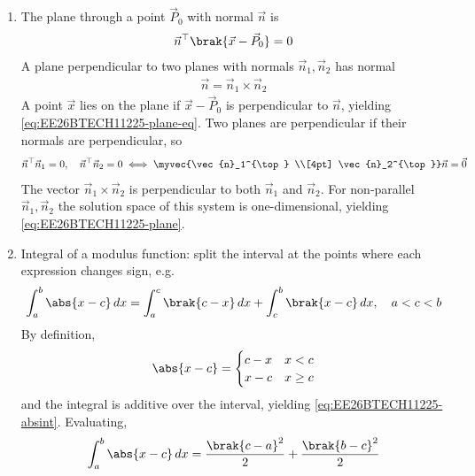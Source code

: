 \begin{enumerate}[label=\thesubsection.\arabic*, ref=\thesubsection.\theenumi]
\item The plane through a point $\vec{P}_0$ with normal $\vec{n}$ is
\begin{align}
	\vec{n}^{\top}\brak{\vec{x} - \vec{P}_0} = 0
	\label{eq:EE26BTECH11225-plane-eq}
\end{align}
A plane perpendicular to two planes with normals $\vec{n}_1, \vec{n}_2$ has normal
\begin{align}
	\vec{n} = \vec{n}_1 \times \vec{n}_2
	\label{eq:EE26BTECH11225-plane}
\end{align}
\solution
A point $\vec{x}$ lies on the plane if $\vec{x} - \vec{P}_0$ is perpendicular to $\vec{n}$, yielding \eqref{eq:EE26BTECH11225-plane-eq}. Two planes are perpendicular if their normals are perpendicular, so
\begin{align}
	\vec{n}^{\top}\vec{n}_1 = 0, \quad \vec{n}^{\top}\vec{n}_2 = 0
	\iff \myvec{\vec{n}_1^{\top} \\[4pt] \vec{n}_2^{\top}}\vec{n} = \vec{0}
\end{align}
The vector $\vec{n}_1 \times \vec{n}_2$ is perpendicular to both $\vec{n}_1$ and $\vec{n}_2$. For non-parallel $\vec{n}_1, \vec{n}_2$ the solution space of this system is one-dimensional, yielding \eqref{eq:EE26BTECH11225-plane}.

\item Integral of a modulus function: split the interval at the points where each expression changes sign, e.g.
\begin{align}
	\int_a^b \abs{x - c}\,dx = \int_a^c \brak{c - x}\,dx + \int_c^b \brak{x - c}\,dx, \quad a < c < b
	\label{eq:EE26BTECH11225-absint}
\end{align}
\solution
By definition,
\begin{align}
	\abs{x - c} =
	\begin{cases}
		c - x & x < c
		\\
		x - c & x \geq c
	\end{cases}
\end{align}
and the integral is additive over the interval, yielding \eqref{eq:EE26BTECH11225-absint}. Evaluating,
\begin{align}
	\int_a^b \abs{x - c}\,dx = \frac{\brak{c - a}^2}{2} + \frac{\brak{b - c}^2}{2}
\end{align}


\end{enumerate}
